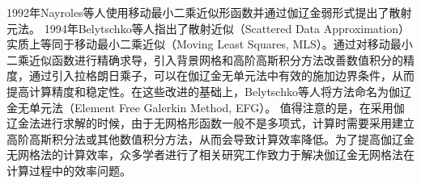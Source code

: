 1992年Nayroles等人\cite{nayroles1992}使用移动最小二乘近似形函数并通过伽辽金弱形式提出了散射元法。
1994年Belytschko等人\cite{belytschko1994}指出了散射近似（Scattered Data Approximation）实质上等同于移动最小二乘近似（Moving Least Squares, MLS）。通过对移动最小二乘近似函数进行精确求导，引入背景网格和高阶高斯积分方法改善数值积分的精度，通过引入拉格朗日乘子，可以在伽辽金无单元法中有效的施加边界条件，从而提高计算精度和稳定性。在这些改进的基础上，Belytschko等人将方法命名为伽辽金无单元法（Element Free Galerkin Method, EFG）。
值得注意的是，在采用伽辽金法进行求解的时候，由于无网格形函数一般不是多项式，计算时需要采用建立高阶高斯积分法或其他数值积分方法\cite{de2001,carpinteri2002,WangBingBing2019}，从而会导致计算效率降低\cite{melenk1996,WuJunChao2016}。为了提高伽辽金无网格法的计算效率，众多学者进行了相关研究工作致力于解决伽辽金无网格法在计算过程中的效率问题\cite{wang2016,wang2019,chen2001,chen2013,duan2012,duan2014}。

